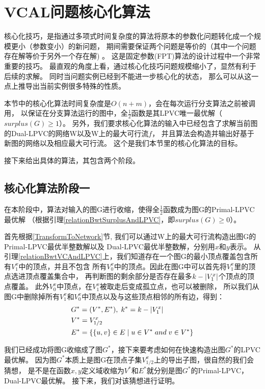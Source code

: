 

\section{VCAL问题核心化算法}
核心化技巧，是指通过多项式时间复杂度的算法将原本的参数化问题转化成一个规模更小（参数变小）的新问题，
期间需要保证两个问题是等价的（其中一个问题存在解等价于另外一个存在解) 。
这是固定参数(FPT)算法的设计过程中一个非常重要的技巧。
最直观的角度上看，通过核心化技巧问题规模缩小了，显然有利于后续的求解。
同时当问题实例已经到不能进一步核心化的状态，
那么可以从这一点上推导出当前实例很多特殊的性质。

本节中的核心化算法时间复杂度是$O(n + m)$，会在每次运行分支算法之前被调用，
以保证在分支算法运行的图中，全$\frac{1}{2}$函数是其LPVC唯一最优解（$surplus(G) \ge 1$）。
另外，我们要求核心化算法的输入中已经包含了求解当前图的Dual-LPVC的网络W以及W上的最大可行流$f$，
并且算法会构造并输出好基于新图的网络以及相应最大可行流。
这个是我们本节里的核心化算法的目标。

接下来给出具体的算法，其包含两个阶段。

\subsection{核心化算法阶段一}
在本阶段中，算法对输入的图G进行收缩，使得全$\frac{1}{2}$函数成为图G的Primal-LPVC最优解
（根据引理\ref{relationBwtSurplusAndLPVC}，即$surplus(G) \ge 0$）。
\vspace{0.5cm}

首先根据\ref{TransformToNetwork}节, 我们可以通过W上的最大可行流构造出图G的Primal-LPVC最优半整数解以及
Dual-LPVC最优半整数解，分别用$x$和$y$表示。
从引理\ref{relationBwtVCAndLPVC}上，我们知道存在一个图G的最小顶点覆盖包含所有$V^x_1$中的顶点，并且不包含
所有$V^x_0$中的顶点。因此在图G中可以首先将$V^x_1$里的顶点选进顶点覆盖集合中，
再判断图的剩余部分是否存在最多$k - \left\vert V^x_1 \right\vert$个顶点的顶点覆盖。
此外$V^x_0$中顶点，在$V^x_1$被取走后变成孤立点，也可以被删除，
所以我们从图G中删除掉所有$V^x_1$和$V^x_0$中顶点以及与这些顶点相邻的所有边，得到：
\begin{equation*}\begin{aligned}
    &G^* = (V^*, E^*),\;k^* = k - \left\vert V^x_1 \right\vert \\
    &V^* = V^x_{1/2} \\
    &E^* = \{\{u, v\} \in E\;|\;u \in V^*\;and\;v\in V^*\}
\end{aligned}\end{equation*}

我们已经成功将图G收缩成了图$G^*$，接下来要考虑如何在快速构造出图$G^*$的LPVC最优解。
因为图$G^*$本质上是图G在顶点子集$V^x_{1/2}$上的导出子图，很自然的我们会猜想，
是不是在函数$x,y$定义域收缩为$V^*$和$E^*$就分别是图$G^*$的Primal-LPVC， Dual-LPVC最优解。
接下来，我们对该猜想进行证明。

